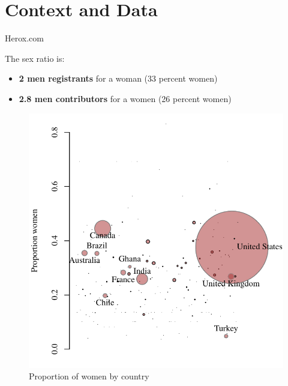 \section{Context and Data}\label{context-and-data}

\begin{frame}{Herox.com}

The sex ratio is:

\begin{itemize}
\tightlist
\item
  \textbf{2 men registrants} for a woman (33 percent women)
\item
  \textbf{2.8 men contributors} for a women (26 percent women)
\end{itemize}

\end{frame}

\begin{frame}

\begin{figure}
\centering
\includegraphics{../Descriptives/desc_files/figure-latex/bayes-1.pdf}
\caption{Proportion of women by country}
\end{figure}

\end{frame}

